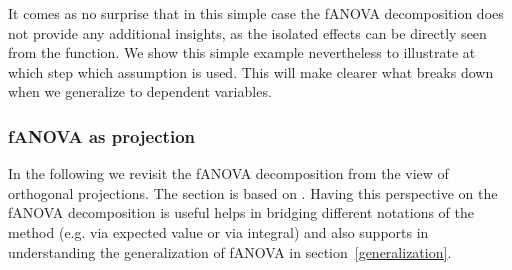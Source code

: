 It comes as no surprise that in this simple case the fANOVA decomposition does not provide any additional insights, as the isolated effects can be directly seen from the function.
We show this simple example nevertheless to illustrate at which step which assumption is used.
This will make clearer what breaks down when we generalize to dependent variables.

\subsubsection{fANOVA as projection}
In the following we revisit the fANOVA decomposition from the view of orthogonal projections. The section is based on \cite{Vaart_1998}.
Having this perspective on the fANOVA decomposition is useful helps in bridging different notations of the method (e.g. via expected value or via integral) and also supports in understanding the generalization of fANOVA in section~\ref{generalization}.\par

